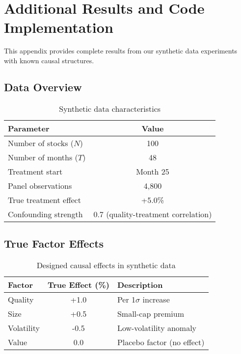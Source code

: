 \chapter{Additional Results and Code Implementation}

This appendix provides complete results from our synthetic data experiments with known causal structures.

\section*{Data Overview}
\begin{table}[H]
    \centering
    \caption{Synthetic data characteristics}
    \begin{tabular}{|l|c|}
        \hline
        \textbf{Parameter} & \textbf{Value} \\
        \hline
        Number of stocks ($N$) & 100 \\
            Number of months ($T$) & 48 \\
    Treatment start & Month 25 \\
    Panel observations & 4,800 \\
    True treatment effect & +5.0\% \\
        Confounding strength & 0.7 (quality-treatment correlation) \\
        \hline
    \end{tabular}
\end{table}

\section*{True Factor Effects}
\begin{table}[H]
    \centering
    \caption{Designed causal effects in synthetic data}
    \begin{tabular}{|l|c|l|}
        \hline
        \textbf{Factor} & \textbf{True Effect (\%)} & \textbf{Description} \\
        \hline
        Quality & +1.0 & Per 1$\sigma$ increase \\
        Size & +0.5 & Small-cap premium \\
        Volatility & -0.5 & Low-volatility anomaly \\
        Value & 0.0 & Placebo factor (no effect) \\
        \hline
    \end{tabular}
\end{table}

